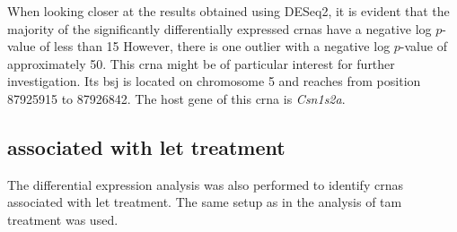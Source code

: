 When looking closer at the results obtained using DESeq2, it is evident that
the majority of the significantly differentially expressed \glspl{crna} have a
negative log $p$-value of less than 15 However, there is one outlier with a
negative log $p$-value of approximately 50.
This \gls{crna} might be of particular interest for further investigation.
Its \gls{bsj} is located on chromosome 5 and reaches from position 87925915 to
87926842.
The host gene of this \gls{crna} is \textit{Csn1s2a}.

\subsection{ associated with \gls{let} treatment}

The differential expression analysis was also performed to identify
\glspl{crna} associated with \gls{let} treatment.
The same setup as in the analysis of \gls{tam} treatment was used.

